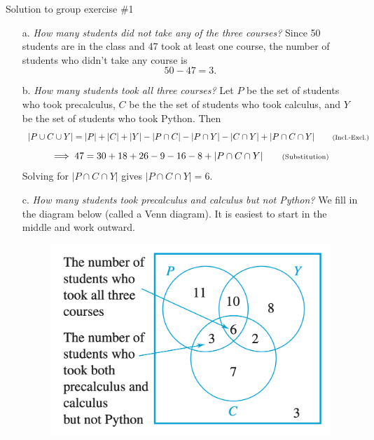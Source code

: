 \documentclass[10pt]{beamer}
\begin{document}
\begin{frame}{Solution to group exercise \#1}
\footnotesize
\begin{itemize}
\item[a.] \textit{How many students did not take any of the three courses?} Since 50 students are in the class and 47 took at least one course, the number of students who didn't take any course is
\[50-47=3. \]
\item[b.] \textit{ How many students took all three courses?} Let $P$ be the set of students who took precalculus, $C$ be the the set of students who took calculus, and $Y$ be the set of students who took Python.   Then 
%
\[ 
|P\cup C \cup Y| = |P| + |C| + |Y| - |P \cap C| - |P \cap Y| - |C \cap Y| + |P \cap C \cap Y| \qquad \text{\scriptsize{{(Incl.-Excl.)}}}  \]
\[ \implies 47 = 30 + 18 + 26 - 9 - 16 -8 + |P \cap C \cap Y|	 \qquad \text{\scriptsize{{(Substitution)}}}\]
Solving for $|P \cap C \cap Y|$ gives $|P \cap C \cap Y|	=6$.	
\item[c.] \textit{How many students took precalculus and calculus but not Python?} We fill in the diagram below (called a Venn diagram). It is easiest to start in the middle and work outward.

\begin{figure}
\includegraphics[width=.4\textwidth]{images/epps_inclusion_exclusion_venn_diagram.png}	
\end{figure}
 
\end{itemize}

\end{frame}
\end{document}

